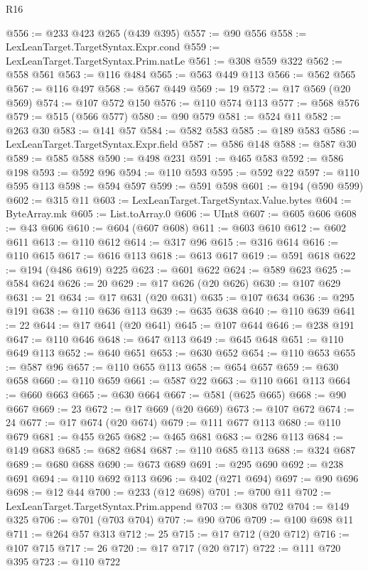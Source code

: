 \begin{lexlean}{R16}
\begin{coremodule}
@556 := @233 @423 @265 (@439 @395)
@557 := @90 @556
@558 := LexLeanTarget.TargetSyntax.Expr.cond
@559 := LexLeanTarget.TargetSyntax.Prim.natLe
@561 := @308 @559 @322
@562 := @558 @561
@563 := @116 @484
@565 := @563 @449 @113
@566 := @562 @565
@567 := @116 @497
@568 := @567 @449
@569 := 19
@572 := @17 @569 (@20 @569)
@574 := @107 @572 @150
@576 := @110 @574 @113
@577 := @568 @576
@579 := @515 (@566 @577)
@580 := @90 @579
@581 := @524 @11
@582 := @263 @30
@583 := @141 @57
@584 := @582 @583
@585 := @189 @583
@586 := LexLeanTarget.TargetSyntax.Expr.field
@587 := @586 @148
@588 := @587 @30
@589 := @585 @588
@590 := @498 @231
@591 := @465 @583
@592 := @586 @198
@593 := @592 @96
@594 := @110 @593
@595 := @592 @22
@597 := @110 @595 @113
@598 := @594 @597
@599 := @591 @598
@601 := @194 (@590 @599)
@602 := @315 @11
@603 := LexLeanTarget.TargetSyntax.Value.bytes
@604 := ByteArray.mk
@605 := List.toArray.{0}
@606 := UInt8
@607 := @605 @606
@608 := @43 @606
@610 := @604 (@607 @608)
@611 := @603 @610
@612 := @602 @611
@613 := @110 @612
@614 := @317 @96
@615 := @316 @614
@616 := @110 @615
@617 := @616 @113
@618 := @613 @617
@619 := @591 @618
@622 := @194 (@486 @619) @225
@623 := @601 @622
@624 := @589 @623
@625 := @584 @624
@626 := 20
@629 := @17 @626 (@20 @626)
@630 := @107 @629
@631 := 21
@634 := @17 @631 (@20 @631)
@635 := @107 @634
@636 := @295 @191
@638 := @110 @636 @113
@639 := @635 @638
@640 := @110 @639
@641 := 22
@644 := @17 @641 (@20 @641)
@645 := @107 @644
@646 := @238 @191
@647 := @110 @646
@648 := @647 @113
@649 := @645 @648
@651 := @110 @649 @113
@652 := @640 @651
@653 := @630 @652
@654 := @110 @653
@655 := @587 @96
@657 := @110 @655 @113
@658 := @654 @657
@659 := @630 @658
@660 := @110 @659
@661 := @587 @22
@663 := @110 @661 @113
@664 := @660 @663
@665 := @630 @664
@667 := @581 (@625 @665)
@668 := @90 @667
@669 := 23
@672 := @17 @669 (@20 @669)
@673 := @107 @672
@674 := 24
@677 := @17 @674 (@20 @674)
@679 := @111 @677 @113
@680 := @110 @679
@681 := @455 @265
@682 := @465 @681
@683 := @286 @113
@684 := @149 @683
@685 := @682 @684
@687 := @110 @685 @113
@688 := @324 @687
@689 := @680 @688
@690 := @673 @689
@691 := @295 @690
@692 := @238 @691
@694 := @110 @692 @113
@696 := @402 (@271 @694)
@697 := @90 @696
@698 := @12 @44
@700 := @233 (@12 @698)
@701 := @700 @11
@702 := LexLeanTarget.TargetSyntax.Prim.append
@703 := @308 @702
@704 := @149 @325
@706 := @701 (@703 @704)
@707 := @90 @706
@709 := @100 @698 @11
@711 := @264 @57 @313
@712 := 25
@715 := @17 @712 (@20 @712)
@716 := @107 @715
@717 := 26
@720 := @17 @717 (@20 @717)
@722 := @111 @720 @395
@723 := @110 @722

\end{coremodule}
\end{lexlean}
